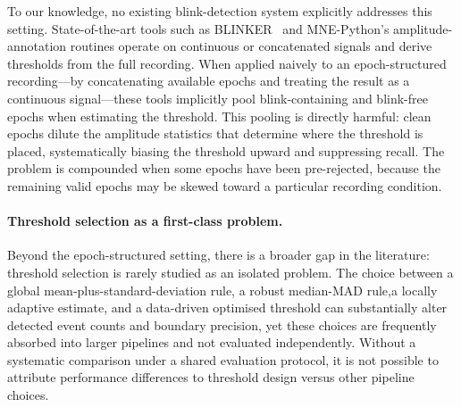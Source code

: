 To our knowledge, no existing blink-detection system explicitly addresses this setting.  State-of-the-art tools such as BLINKER~\citep{kleifges2017blinker} and MNE-Python's amplitude-annotation routines operate on continuous or concatenated signals and derive thresholds from the full recording.
When applied naively to an epoch-structured recording---by concatenating available epochs and treating the result as a continuous signal---these tools implicitly pool blink-containing and blink-free epochs when estimating the threshold.
This pooling is directly harmful: clean epochs dilute the amplitude statistics that determine where the threshold is placed, systematically biasing the threshold upward
and suppressing recall.
The problem is compounded when some epochs have been pre-rejected, because the remaining valid epochs may be skewed toward a particular recording condition.




\paragraph{Threshold selection as a first-class problem.}
Beyond the epoch-structured setting, there is a broader gap in the literature: threshold selection is rarely studied as an isolated problem.
The choice between a global mean-plus-standard-deviation rule, a robust median-MAD rule,a locally adaptive estimate, and a data-driven optimised threshold can substantially alter detected event counts and boundary precision, yet these choices are frequently absorbed into larger pipelines and not evaluated independently.
Without a systematic comparison under a shared evaluation protocol, it is not possible to attribute performance differences to threshold design versus other pipeline choices.

